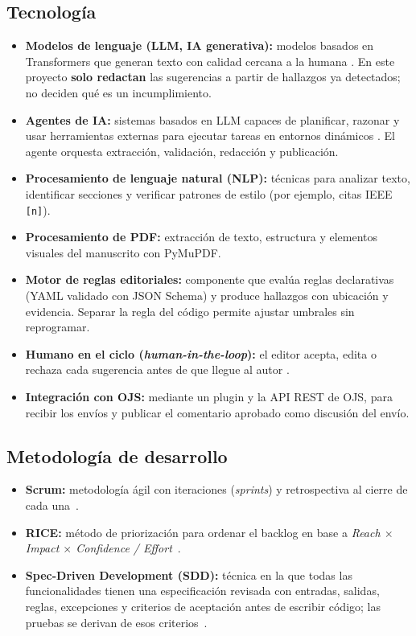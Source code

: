 \subsection{Tecnología}

\begin{itemize}
  \item \textbf{Modelos de lenguaje (LLM, IA generativa):} modelos basados en Transformers que generan texto con calidad cercana a la humana \cite{ref27}. En este proyecto \textbf{solo redactan} las sugerencias a partir de hallazgos ya detectados; no deciden qué es un incumplimiento.
  \item \textbf{Agentes de IA:} sistemas basados en LLM capaces de planificar, razonar y usar herramientas externas para ejecutar tareas en entornos dinámicos \cite{ref28}. El agente orquesta extracción, validación, redacción y publicación.
  \item \textbf{Procesamiento de lenguaje natural (NLP):} técnicas para analizar texto, identificar secciones y verificar patrones de estilo (por ejemplo, citas IEEE \texttt{[n]}).
  \item \textbf{Procesamiento de PDF:} extracción de texto, estructura y elementos visuales del manuscrito con PyMuPDF.
  \item \textbf{Motor de reglas editoriales:} componente que evalúa reglas declarativas (YAML validado con JSON Schema) y produce hallazgos con ubicación y evidencia. Separar la regla del código permite ajustar umbrales sin reprogramar.
  \item \textbf{Humano en el ciclo (\emph{human-in-the-loop}):} el editor acepta, edita o rechaza cada sugerencia antes de que llegue al autor \cite{ref20}.
  \item \textbf{Integración con OJS:} mediante un plugin y la API REST de OJS, para recibir los envíos y publicar el comentario aprobado como discusión del envío.
\end{itemize}

\subsection{Metodología de desarrollo}

\begin{itemize}
  \item \textbf{Scrum:} metodología ágil con iteraciones (\emph{sprints}) y retrospectiva al cierre de cada una~\cite{ref30}.
  \item \textbf{RICE:} método de priorización para ordenar el backlog en base a \emph{Reach $\times$ Impact $\times$ Confidence / Effort}~\cite{ref31}.
  \item \textbf{Spec-Driven Development (SDD):} técnica en la que todas las funcionalidades tienen una especificación revisada con entradas, salidas, reglas, excepciones y criterios de aceptación antes de escribir código; las pruebas se derivan de esos criterios~\cite{ref32}.
\end{itemize}

